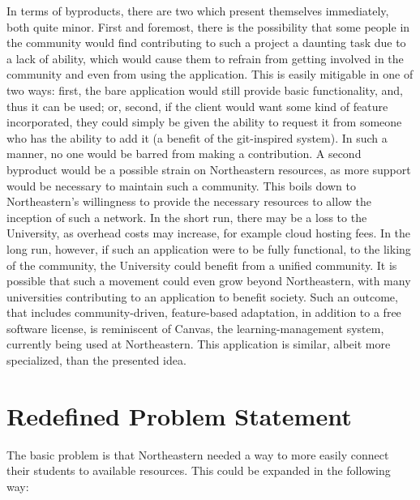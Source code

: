 \documentclass[conference]{IEEEtran}
\begin{document}
In terms of byproducts, there are two which present themselves immediately, both quite minor. First and foremost, there is the possibility that some people in the community would find contributing to such a project a daunting task due to a lack of ability, which would cause them to refrain from getting involved in the community and even from using the application. This is easily mitigable in one of two ways: first, the bare application would still provide basic functionality, and, thus it can be used; or, second, if the client would want some kind of feature incorporated, they could simply be given the ability to request it from someone who has the ability to add it (a benefit of the git-inspired system). In such a manner, no one would be barred from making a contribution. A second byproduct would be a possible strain on Northeastern resources, as more support would be necessary to maintain such a community. This boils down to Northeastern's willingness to provide the necessary resources to allow the inception of such a network. In the short run, there may be a loss to the University, as overhead costs may increase, for example cloud hosting fees. In the long run, however, if such an application were to be fully functional, to the liking of the community, the University could benefit from a unified community. It is possible that such a movement could even grow beyond Northeastern, with many universities contributing to an application to benefit society. Such an outcome, that includes community-driven, feature-based adaptation, in addition to a free software license, is reminiscent of Canvas, the learning-management system, currently being used at Northeastern. This application is similar, albeit more specialized, than the presented idea.

\section{Redefined Problem Statement}

The basic problem is that Northeastern needed a way to more easily connect their students to available resources. This could be expanded in the following way:
\end{document}
